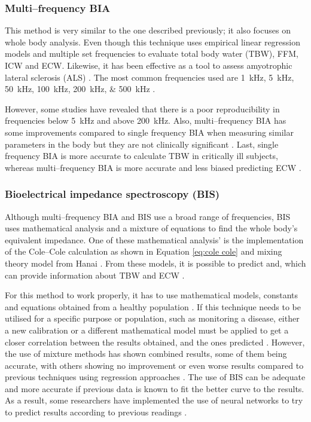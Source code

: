 \subsubsection{Multi–frequency BIA}
This method is very similar to the one described previously; it also focuses on whole body analysis. Even though this technique uses empirical linear regression models and multiple set frequencies to evaluate total body water (TBW), FFM, ICW and ECW. Likewise, it has been effective as a tool to assess amyotrophic lateral sclerosis (ALS) \cite{wang2011electrical}. The most common frequencies used are \SIlist{1;5;50;100;200;500}{\kilo\hertz} \cite{kyle2004bioelectrical}. 

However, some studies have revealed that there is a poor reproducibility in frequencies below \SI{5}{\kilo\hertz} and above \SI{200}{\kilo\hertz}. Also, multi–frequency BIA has some improvements compared to single frequency BIA when measuring similar parameters in the body but they are not clinically significant \cite{hannan1995comparison}. Last, single frequency BIA is more accurate to calculate TBW in critically ill subjects, whereas multi–frequency BIA is more accurate and less biased predicting ECW \cite{patel1996estimation}. 

\subsubsection{Bioelectrical impedance spectroscopy (BIS)}
Although multi–frequency BIA and BIS use a broad range of frequencies, BIS uses mathematical analysis and a mixture of equations to find the whole body’s equivalent impedance. One of these mathematical analysis’ is the implementation of the Cole–Cole \cite{cole1941dispersion} calculation as shown in Equation \ref{eq:cole cole} and mixing theory model from Hanai \cite{hanai1968electrical}. From these models, it is possible to predict and, which can provide information about TBW and ECW \cite{hanai1968electrical}. 

For this method to work properly, it has to use mathematical models, constants and equations obtained from a healthy population \cite{patel1994estimation}. If this technique needs to be utilised for a specific purpose or population, such as monitoring a disease, either a new calibration or a different mathematical model must be applied to get a closer correlation between the results obtained, and the ones predicted \cite{schoeller2000bioelectrical, de1997predicting}. However, the use of mixture methods has shown combined results, some of them being accurate, with others showing no improvement or even worse results compared to previous techniques using regression approaches \cite{kyle2004bioelectrical}. The use of BIS can be adequate and more accurate if previous data is known to fit the better curve to the results. As a result, some researchers have implemented the use of neural networks to try to predict results according to previous readings \cite{songer2001tissue,kun2003algorithm}. 

